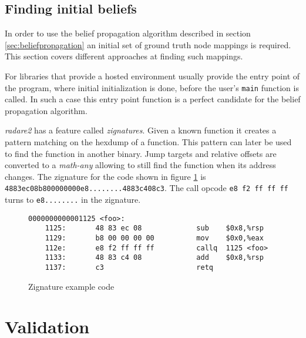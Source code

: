 \documentclass[
    12pt,                               %
    DIV=14,                     %
    parskip=half+,              %
    bigheadings,                %
    cleardoubleempty,   %
    halfparskip,                %
    ]{scrreprt} %
\begin{document}
\section{Finding initial beliefs} \label{sec:findtruth}
In order to use the belief propagation algorithm described in section \ref{sec:beliefpropagation} an initial set of ground truth node mappings is required. This section covers different approaches at finding such mappings.

For libraries that provide a hosted environment usually provide the entry point of the program, where initial initialization is done, before the user's \verb'main' function is called. In such a case this entry point function is a perfect candidate for the belief propagation algorithm.

\textit{radare2} has a feature called \textit{zignatures}\cite{zignatures}. Given a known function it creates a pattern matching on the hexdump of a function. This pattern can later be used to find the function in another binary. Jump targets and relative offsets are converted to a \textit{math-any} allowing to still find the function when its address changes. The zignature for the code shown in figure \ref{fig:zignatures} is \verb'4883ec08b800000000e8........4883c408c3'. The call opcode \verb'e8 f2 ff ff ff' turns to \verb'e8........' in the zignature.

\begin{figure}[H]
	\begin{lstlisting}
0000000000001125 <foo>:
    1125:       48 83 ec 08             sub    $0x8,%rsp
    1129:       b8 00 00 00 00          mov    $0x0,%eax
    112e:       e8 f2 ff ff ff          callq  1125 <foo>
    1133:       48 83 c4 08             add    $0x8,%rsp
    1137:       c3                      retq
	\end{lstlisting}
	\caption{Zignature example code}
	\label{fig:zignatures}
\end{figure}


\chapter{Validation} \label{chap:validation}
\end{document}
